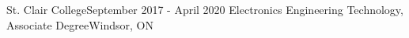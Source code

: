 \resumeSubheading
{St. Clair College}{September 2017 - April 2020}
{Electronics Engineering Technology, Associate Degree}{Windsor, ON}
